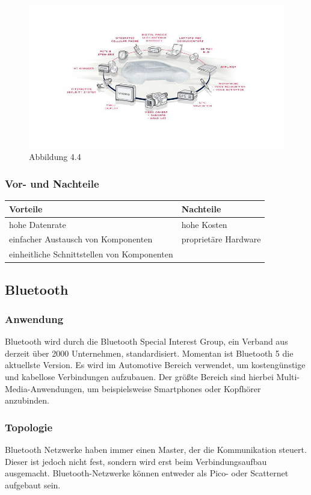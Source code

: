 \begin{figure}[h!]
	\includegraphics[width=\linewidth]{most_ring.jpg}
	\caption[https://images.tecchannel.de/bdb/361603/840x473.jpg]{Abbildung 4.4}
\end{figure}

\subsubsection{Vor- und Nachteile}
\begin{tabular}{l|l}
	\textbf{Vorteile} & \textbf{Nachteile}\\
	\hline hohe Datenrate & hohe Kosten\\
	\hline einfacher Austausch von Komponenten & proprietäre Hardware\\
	\hline einheitliche Schnittstellen von Komponenten &\\
\end{tabular}

\subsection{Bluetooth}		
\subsubsection{Anwendung}
Bluetooth wird durch die Bluetooth Special Interest Group, ein Verband aus derzeit über 2000 Unternehmen,  standardisiert. Momentan ist Bluetooth 5 die aktuellste Version. Es wird im Automotive Bereich verwendet, um kostengünstige und kabellose Verbindungen aufzubauen. Der größte Bereich sind hierbei Multi-Media-Anwendungen, um beispielsweise Smartphones oder Kopfhörer anzubinden. \cite{BP01}

\subsubsection{Topologie}
Bluetooth Netzwerke haben immer einen Master, der die Kommunikation steuert. Dieser ist jedoch nicht fest, sondern wird erst beim Verbindungsaufbau ausgemacht.
Bluetooth-Netzwerke können entweder als Pico- oder Scatternet aufgebaut sein.
                                                                                  
